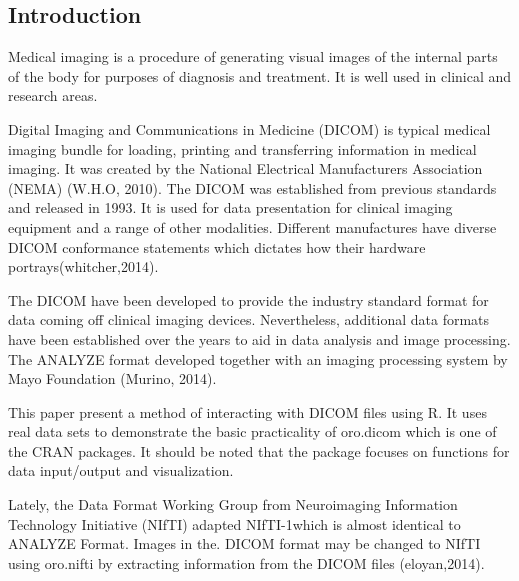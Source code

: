 \documentclass[10pt]{article}\usepackage[]{graphicx}\usepackage[]{color}
\begin{document}
\subsection*{Introduction}
Medical imaging is a procedure of generating visual images of the internal parts of the
body for purposes of diagnosis and treatment. It is well used in clinical and research
areas.\par Digital Imaging and Communications in Medicine (DICOM) is typical medical
imaging bundle for loading, printing and transferring information in medical imaging.
It was created by the National Electrical Manufacturers Association (NEMA)
(W.H.O, 2010). The DICOM was established from previous standards and released in
1993. It is used for data presentation for clinical imaging equipment and a range of
other modalities. Different manufactures have diverse DICOM conformance
statements which dictates how their hardware portrays(whitcher,2014).\par The DICOM have been developed to provide the industry standard format for data
coming off clinical imaging devices. Nevertheless, additional data formats have been
established over the years to aid in data analysis and image processing. The
ANALYZE format developed together with an imaging processing system by Mayo
Foundation (Murino, 2014). \par This paper present a method of interacting with DICOM files using R. It uses real
data sets to demonstrate the basic practicality of oro.dicom which is one of the
CRAN packages. It should be noted that the package focuses on functions for data
input/output and visualization. \par Lately, the Data Format Working Group from Neuroimaging Information Technology
Initiative (NIfTI) adapted NIfTI-1which is almost identical to ANALYZE Format.
Images in the. DICOM format may be changed to NIfTI using oro.nifti by extracting
information from the DICOM files (eloyan,2014).
\vfill
\end{document}

